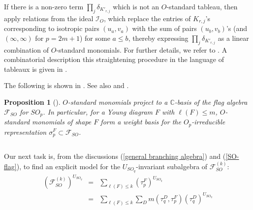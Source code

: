 \documentclass[11pt]{amsart}
\numberwithin{equation}{subsection}
\newtheorem{proposition}[theorem]{Proposition}
\begin{document}
If there is a non-zero term  $\prod_{j} \delta_{K'_{r,j}}$ which is not 
an $O$-standard tableau, then apply relations from the ideal
$\mathcal{I}_{{O}}$, which replace the entries of  $K_{r,j}$'s corresponding to isotropic
pairs $(u_a, v_a)$ with the sum of pairs $(u_b, v_b)$'s (and $(\infty, \infty)$ for $p=2m+1$) for 
some $a \leq b$, thereby expressing $\prod_{j} \delta_{K'_{r,j}}$ as a linear
combination of $O$-standard monomials. For further details, we refer to \cite{Ki09}.  
A combinatorial description this straightening procedure in the language of tableaux 
is given in \cite{KW93}.

\smallskip

The following is shown in \cite{Ki09}. See also \cite{KW93} and \cite{Pr94}.

\begin{proposition}[{}]\label{SO_flagSMT}
${O}$-standard monomials project to a $\mathbb{C}$-basis
of the flag algebra $\mathcal{F}_{{SO}}$ for ${SO}_{p}$. In particular, for
a Young diagram $F$ with $\ell (F)\leq m$, ${O}$-\textit{standard monomials}
of shape $F$ form a weight basis for the ${O}_{p}$-irreducible
representation $\sigma_{p}^{F}\subset \mathcal{F}_{{SO}}$.
\end{proposition}


\subsection{}\label{SO-U-invariants} 
Our next task is, from the discussions (\ref{general branching algebra})
and (\ref{SO-flag}), to find an explicit model for the 
$U_{{SO}_{q}}$-invariant subalgebra of $\mathcal{F}_{{SO}}^{(k)}$:
\begin{eqnarray*}
\left( \mathcal{F}_{{SO}}^{(k)}\right) ^{U_{{SO}_{q}}} &=&\sum_{\ell (F)\leq
k}\left( \tau _{p}^{F}\right) ^{U_{{SO}_{q}}}  \\
&=&\sum_{\ell (F)\leq k}\sum_{D}m(\tau _{q}^{D},\tau _{p}^{F})\left( \tau
_{q}^{D}\right) ^{U_{{SO}_{q}}}  
\end{eqnarray*}
\end{document}
